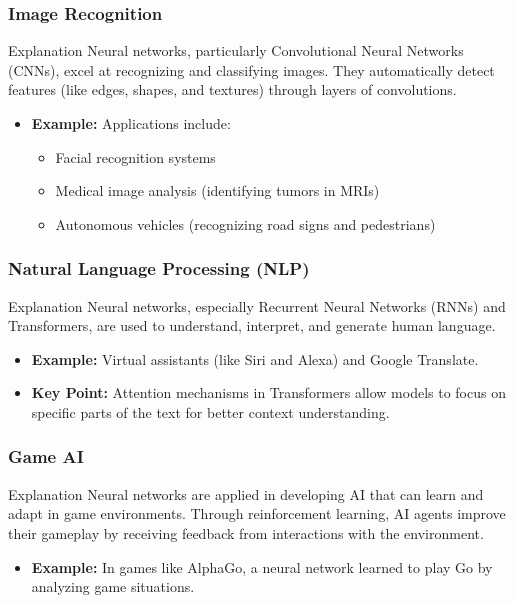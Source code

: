 \documentclass{beamer}
\begin{document}
\begin{frame}
    \frametitle{Image Recognition}
    \begin{block}{Explanation}
        Neural networks, particularly Convolutional Neural Networks (CNNs), excel at recognizing and classifying images. They automatically detect features (like edges, shapes, and textures) through layers of convolutions.
    \end{block}
    \begin{itemize}
        \item \textbf{Example:} Applications include:
            \begin{itemize}
                \item Facial recognition systems
                \item Medical image analysis (identifying tumors in MRIs)
                \item Autonomous vehicles (recognizing road signs and pedestrians)
            \end{itemize}
    \end{itemize}
\end{frame}

\begin{frame}
    \frametitle{Natural Language Processing (NLP)}
    \begin{block}{Explanation}
        Neural networks, especially Recurrent Neural Networks (RNNs) and Transformers, are used to understand, interpret, and generate human language.
    \end{block}
    \begin{itemize}
        \item \textbf{Example:} Virtual assistants (like Siri and Alexa) and Google Translate.
        \item \textbf{Key Point:} Attention mechanisms in Transformers allow models to focus on specific parts of the text for better context understanding.
    \end{itemize}
\end{frame}

\begin{frame}
    \frametitle{Game AI}
    \begin{block}{Explanation}
        Neural networks are applied in developing AI that can learn and adapt in game environments. Through reinforcement learning, AI agents improve their gameplay by receiving feedback from interactions with the environment.
    \end{block}
    \begin{itemize}
        \item \textbf{Example:} In games like AlphaGo, a neural network learned to play Go by analyzing game situations.
    \end{itemize}
\end{frame}
\end{document}
